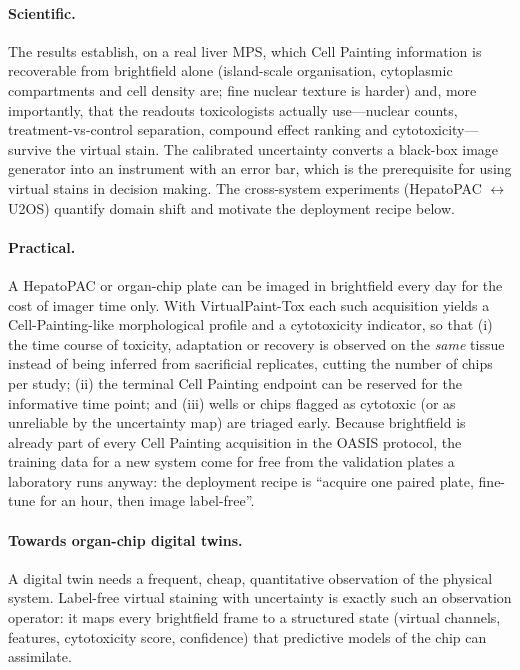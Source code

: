 \documentclass[11pt,a4paper]{article}
\begin{document}
\paragraph{Scientific.} The results establish, on a real liver MPS, which Cell Painting information is recoverable from brightfield alone (island-scale organisation, cytoplasmic compartments and cell density are; fine nuclear texture is harder) and, more importantly, that the readouts toxicologists actually use---nuclear counts, treatment-vs-control separation, compound effect ranking and cytotoxicity---survive the virtual stain. The calibrated uncertainty converts a black-box image generator into an instrument with an error bar, which is the prerequisite for using virtual stains in decision making. The cross-system experiments (HepatoPAC $\leftrightarrow$ U2OS) quantify domain shift and motivate the deployment recipe below.

\paragraph{Practical.} A HepatoPAC or organ-chip plate can be imaged in brightfield every day for the cost of imager time only. With VirtualPaint-Tox each such acquisition yields a Cell-Painting-like morphological profile and a cytotoxicity indicator, so that (i) the time course of toxicity, adaptation or recovery is observed on the \emph{same} tissue instead of being inferred from sacrificial replicates, cutting the number of chips per study; (ii) the terminal Cell Painting endpoint can be reserved for the informative time point; and (iii) wells or chips flagged as cytotoxic (or as unreliable by the uncertainty map) are triaged early. Because brightfield is already part of every Cell Painting acquisition in the OASIS protocol, the training data for a new system come for free from the validation plates a laboratory runs anyway: the deployment recipe is ``acquire one paired plate, fine-tune for an hour, then image label-free''.

\paragraph{Towards organ-chip digital twins.} A digital twin needs a frequent, cheap, quantitative observation of the physical system. Label-free virtual staining with uncertainty is exactly such an observation operator: it maps every brightfield frame to a structured state (virtual channels, features, cytotoxicity score, confidence) that predictive models of the chip can assimilate.
\end{document}
